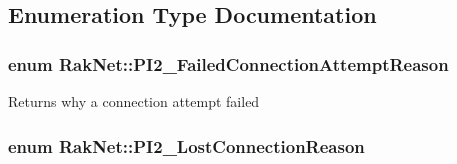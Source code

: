 \subsection{Enumeration Type Documentation}
\hypertarget{group___p_l_u_g_i_n___i_n_t_e_r_f_a_c_e___g_r_o_u_p_ga3e92f686bace869b78c10508c58e0825}{
\subsubsection[{P\-I2\-\_\-\-Failed\-Connection\-Attempt\-Reason}]{\setlength{\rightskip}{0pt plus 5cm}enum {\bf Rak\-Net\-::\-P\-I2\-\_\-\-Failed\-Connection\-Attempt\-Reason}}}\label{group___p_l_u_g_i_n___i_n_t_e_r_f_a_c_e___g_r_o_u_p_ga3e92f686bace869b78c10508c58e0825}
Returns why a connection attempt failed \hypertarget{group___p_l_u_g_i_n___i_n_t_e_r_f_a_c_e___g_r_o_u_p_ga376cc546fd6892c2ead48cd51796c8b8}{
\subsubsection[{P\-I2\-\_\-\-Lost\-Connection\-Reason}]{\setlength{\rightskip}{0pt plus 5cm}enum {\bf Rak\-Net\-::\-P\-I2\-\_\-\-Lost\-Connection\-Reason}}}\label{group___p_l_u_g_i_n___i_n_t_e_r_f_a_c_e___g_r_o_u_p_ga376cc546fd6892c2ead48cd51796c8b8}
